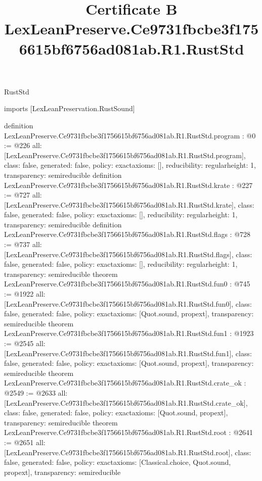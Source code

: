 \begin{lexlean}{RustStd}
\title{Certificate B LexLeanPreserve.Ce9731fbcbe3f1756615bf6756ad081ab.R1.RustStd}
\begin{coremodule}
imports [LexLeanPreservation.RustSound]

definition LexLeanPreserve.Ce9731fbcbe3f1756615bf6756ad081ab.R1.RustStd.program : @0 := @226 {
  all: [LexLeanPreserve.Ce9731fbcbe3f1756615bf6756ad081ab.R1.RustStd.program],
  class: false,
  generated: false,
  policy: exact{axioms: []},
  reducibility: regular{height: 1},
  transparency: semireducible
}
definition LexLeanPreserve.Ce9731fbcbe3f1756615bf6756ad081ab.R1.RustStd.krate : @227 := @727 {
  all: [LexLeanPreserve.Ce9731fbcbe3f1756615bf6756ad081ab.R1.RustStd.krate],
  class: false,
  generated: false,
  policy: exact{axioms: []},
  reducibility: regular{height: 1},
  transparency: semireducible
}
definition LexLeanPreserve.Ce9731fbcbe3f1756615bf6756ad081ab.R1.RustStd.flags : @728 := @737 {
  all: [LexLeanPreserve.Ce9731fbcbe3f1756615bf6756ad081ab.R1.RustStd.flags],
  class: false,
  generated: false,
  policy: exact{axioms: []},
  reducibility: regular{height: 1},
  transparency: semireducible
}
theorem LexLeanPreserve.Ce9731fbcbe3f1756615bf6756ad081ab.R1.RustStd.fun0 : @745 := @1922 {
  all: [LexLeanPreserve.Ce9731fbcbe3f1756615bf6756ad081ab.R1.RustStd.fun0],
  class: false,
  generated: false,
  policy: exact{axioms: [Quot.sound, propext]},
  transparency: semireducible
}
theorem LexLeanPreserve.Ce9731fbcbe3f1756615bf6756ad081ab.R1.RustStd.fun1 : @1923 := @2545 {
  all: [LexLeanPreserve.Ce9731fbcbe3f1756615bf6756ad081ab.R1.RustStd.fun1],
  class: false,
  generated: false,
  policy: exact{axioms: [Quot.sound, propext]},
  transparency: semireducible
}
theorem LexLeanPreserve.Ce9731fbcbe3f1756615bf6756ad081ab.R1.RustStd.crate_ok : @2549 := @2633 {
  all: [LexLeanPreserve.Ce9731fbcbe3f1756615bf6756ad081ab.R1.RustStd.crate_ok],
  class: false,
  generated: false,
  policy: exact{axioms: [Quot.sound, propext]},
  transparency: semireducible
}
theorem LexLeanPreserve.Ce9731fbcbe3f1756615bf6756ad081ab.R1.RustStd.root : @2641 := @2651 {
  all: [LexLeanPreserve.Ce9731fbcbe3f1756615bf6756ad081ab.R1.RustStd.root],
  class: false,
  generated: false,
  policy: exact{axioms: [Classical.choice, Quot.sound, propext]},
  transparency: semireducible
}


\end{coremodule}
\end{lexlean}
